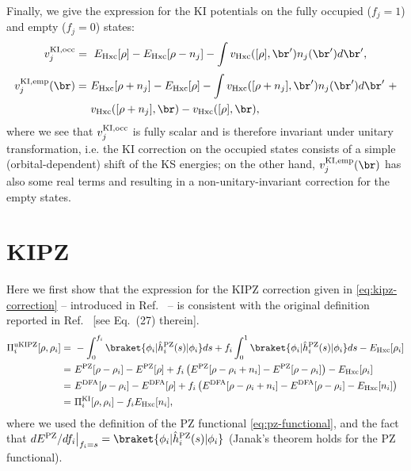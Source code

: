 Finally, we give the expression for the KI potentials on the fully occupied ($f_j=1$) and empty ($f_j=0$) states:
%
\begin{equation}
    v^{\rm KI,occ}_j =\ E_{\rm Hxc}[\rho] - E_{\rm Hxc}[\rho-n_j] - \int v_{\rm Hxc}([\rho],\br') n_j(\br') d\br' ,
    \label{eq:ki-pot-occ}
\end{equation}
%
\begin{equation}
    \begin{split}
    v^{\rm KI,emp}_j(\br) =\ &E_{\rm Hxc}[\rho+n_j] - E_{\rm Hxc}[\rho] - \int v_{\rm Hxc}([\rho+n_j],\br') n_j(\br') d\br' \ + \\
    &v_{\rm Hxc}([\rho+n_j],\br) - v_{\rm Hxc}([\rho],\br) ,
    \end{split}
    \label{eq:ki-pot-emp}
\end{equation}
%
where we see that $v^{\rm KI,occ}_j$ is fully scalar and is therefore invariant under unitary transformation, i.e. the KI correction on the occupied states consists of a simple (orbital-dependent) shift of the KS energies; on the other hand, $v^{\rm KI,emp}_j(\br)$ has also some real terms and resulting in a non-unitary-invariant correction for the empty states.

\clearpage
\section*{KIPZ}
Here we first show that the expression for the KIPZ correction given in \cref{eq:kipz-correction} -- introduced in Ref.~\cite{nguyen_koopmans-compliant_2018} -- is consistent with the original definition reported in Ref.~\cite{borghi_koopmans-compliant_2014} [see Eq.~(27) therein].
%
\begin{equation}
    \begin{split}
    \Pi^{\rm uKIPZ}_i[\rho,\rho_i] =\ &- \int_{0}^{f_i} \braket{\phi_i|\hat{h}^{\rm PZ}_i(s)|\phi_i} ds + 
    f_i \int_{0}^{1} \braket{\phi_i|\hat{h}^{\rm PZ}_i(s)|\phi_i} ds - E_{\rm Hxc}[\rho_i] \\
    =\ &E^{\rm PZ}[\rho-\rho_i] - E^{\rm PZ}[\rho] + f_i \left( E^{\rm PZ}[\rho-\rho_i+n_i] - E^{\rm PZ}[\rho-\rho_i] \right) - E_{\rm Hxc}[\rho_i] \\
    =\ &E^{\rm DFA}[\rho-\rho_i] - E^{\rm DFA}[\rho] + f_i \left( E^{\rm DFA}[\rho-\rho_i+n_i] - E^{\rm DFA}[\rho-\rho_i] - E_{\rm Hxc}[n_i] \right) \\
    =\ &\Pi^{\text{KI}}_i[\rho,\rho_i] - f_i E_{\rm Hxc}[n_i] ,
    \end{split}
    \label{eq:kipz-borghi}
\end{equation}
%
where we used the definition of the PZ functional \eqref{eq:pz-functional}, and the fact that $dE^{\rm PZ} / df_i \big|_{f_i=s} = \braket{\phi_i|\hat{h}^{\rm PZ}_i(s)|\phi_i}$ (Janak's theorem holds for the PZ functional).

